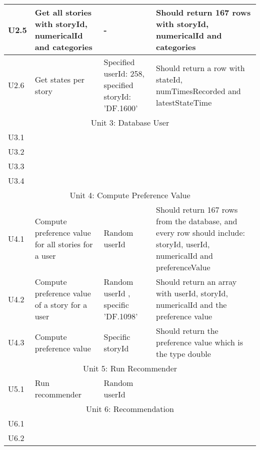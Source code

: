 {\begin{center}
\begin{longtable}{ | p{1.5cm} | p{6.5cm} | p{3cm} | p{6.5cm} |}
			U2.5 & Get all stories with storyId, numericalId and categories & - & Should return 167 rows with storyId, numericalId and categories  \\ \hline
			
			U2.6 & Get states per story  & Specified userId: 258, specified storyId: 'DF.1600'& Should return a row with stateId, numTimesRecorded and latestStateTime  \\ \hline
			
			\multicolumn{4}{c}{Unit 3: Database User}	\\\hline
						
			U3.1 &  & &   \\ \hline
			
			U3.2 &  & &  \\ \hline
			
			U3.3 &  & &   \\ \hline
			
			U3.4 &  & &   \\ \hline
			
			\multicolumn{4}{c}{Unit 4: Compute Preference Value}	\\\hline
			
			U4.1 & Compute preference value for all stories for a  user & Random userId & Should return 167 rows from the database, and every row should include: storyId, userId, numericalId and preferenceValue   \\ \hline
			
			U4.2 & Compute preference value of a story for a user  & Random userId , specific 'DF.1098' & Should return an array with userId, storyId, numericalId and the preference value \\ \hline
			
			U4.3 & Compute preference value & Specific storyId  & Should return the preference value which is the type double \\ \hline
			
			\multicolumn{4}{c}{Unit 5: Run Recommender}	\\\hline
			
			U5.1 & Run recommender & Random userId  &  \\ \hline			
			
			\multicolumn{4}{c}{Unit 6: Recommendation}	\\\hline 
			

			
			U6.1 &  & &  \\ \hline			
			
			U6.2 &  & &  \\ \hline	
			

\end{longtable}
\end{center}}
